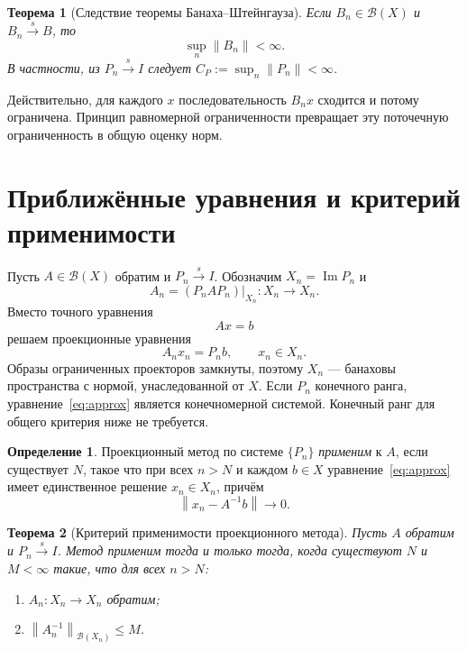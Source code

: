 \documentclass[12pt,a4paper]{article}
\newtheorem{theorem}{Теорема}
\theoremstyle{definition}
\newtheorem{definition}{Определение}
\theoremstyle{remark}
\newcommand{\norm}[1]{\left\lVert #1\right\rVert}
\newcommand{\BB}{\mathcal B}
\begin{document}
\begin{theorem}[Следствие теоремы Банаха--Штейнгауза]
Если $B_n\in\BB(X)$ и $B_n\xrightarrow{s}B$, то
\[
  \sup_n\norm{B_n}<\infty.
\]
В частности, из $P_n\xrightarrow{s}I$ следует
$C_P:=\sup_n\norm{P_n}<\infty$.
\end{theorem}

Действительно, для каждого $x$ последовательность $B_nx$
сходится и потому ограничена. Принцип равномерной ограниченности
превращает эту поточечную ограниченность в общую оценку норм.

\section{Приближённые уравнения и критерий применимости}

Пусть $A\in\BB(X)$ обратим и $P_n\xrightarrow{s}I$.
Обозначим $X_n=\operatorname{Im}P_n$ и
\[
  A_n=(P_nAP_n)|_{X_n}:X_n\to X_n.
\]
Вместо точного уравнения
\begin{equation}\label{eq:exact}
  Ax=b
\end{equation}
решаем проекционные уравнения
\begin{equation}\label{eq:approx}
  A_nx_n=P_nb,\qquad x_n\in X_n.
\end{equation}
Образы ограниченных проекторов замкнуты, поэтому $X_n$ ---
банаховы пространства с нормой, унаследованной от $X$.
Если $P_n$ конечного ранга, уравнение~\eqref{eq:approx}
является конечномерной системой. Конечный ранг для общего
критерия ниже не требуется.

\begin{definition}
Проекционный метод по системе $\{P_n\}$ \emph{применим} к $A$,
если существует $N$, такое что при всех $n>N$ и каждом $b\in X$
уравнение~\eqref{eq:approx} имеет единственное решение $x_n\in X_n$,
причём
\[
  \norm{x_n-A^{-1}b}\longrightarrow0.
\]
\end{definition}

\begin{theorem}[Критерий применимости проекционного метода]
Пусть $A$ обратим и $P_n\xrightarrow{s}I$. Метод применим
тогда и только тогда, когда существуют $N$ и $M<\infty$ такие, что
для всех $n>N$:
\begin{enumerate}
  \item $A_n:X_n\to X_n$ обратим;
  \item $\norm{A_n^{-1}}_{\BB(X_n)}\leqslant M$.
\end{enumerate}
\end{theorem}
\end{document}
